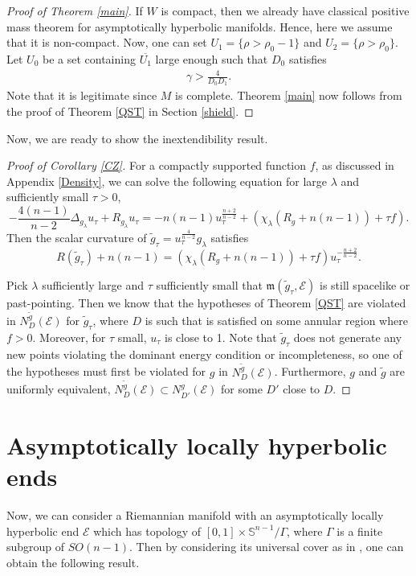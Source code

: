 \documentclass[11pt]{amsart}
\makeatletter
\renewcommand*{\eqref}[1]{%
  \hyperref[{#1}]{\textup{\tagform@{\ref*{#1}}}}%
}
\newcommand{\be}{\begin{equation}}
\newcommand{\ee}{\end{equation}}
\theoremstyle{remark}
\numberwithin{equation}{section}
\def\be{\begin{equation}}
\def\ee{\end{equation}}
\def\m{\mathfrak{m}}
\def\l{\lambda}
\def\mE{\mathcal{E}}
\def\mE{\mathcal{E}}
\def\l {\lambda}
\makeatother
\begin{document}
{{\begin{proof}[Proof of Theorem \ref{main}]
If $W$ is compact, then we already have classical positive mass theorem for asymptotically hyperbolic manifolds. Hence, here we assume that it is non-compact. Now, one can set $U_1=\{\rho > \rho_0-1\}$ and $U_2=\{\rho > \rho_0\}$. Let $U_0$ be a set containing $\overline{U_1}$ large enough such that $D_0$ satisfies 
\be 
\begin{split}
\gamma>\frac{4}{D_0D_1}. 
\end{split}
\ee 
Note that it is legitimate since $M$ is complete. Theorem \ref{main} now follows from the proof of Theorem \ref{QST} in Section \ref{shield}. 
\end{proof}

Now, we are ready to show the inextendibility result. 

\begin{proof}[Proof of Corollary \ref{CZ}]
For a compactly supported function $f$, as discussed in Appendix \ref{Density}, we can solve the following equation for large $\l$ and sufficiently small $\tau>0$, 
\[-\frac{4(n-1)}{n-2}\Delta_{g_{\lambda}} u_\tau + R_{g_\l} u_{\tau}=-n(n-1) u_{\tau}^{\frac{n+2}{n-2}}+(\chi_{\lambda}(R_g+n(n-1))+\tau f).\]
Then the scalar curvature of $\tilde g_{\tau}=u_{\tau}^{\frac{4}{n-2}}g_{\l}$ satisfies 
\[R(\tilde g_\tau)+n(n-1)=(\chi_{\lambda}(R_g+n(n-1))+\tau f)u^{-\frac{n+2}{n-2}}_\tau.\] 

Pick $\l$ sufficiently large and $\tau$ sufficiently small that $\m(\tilde g_{\tau},\mE)$ is still spacelike or past-pointing. Then we know that the hypotheses of Theorem \ref{QST} are violated in $N_D^{\tilde g}(\mathcal E)$ for $\tilde g_{\tau}$, where $D$ is such that \eqref{largeness} is satisfied on some annular region where $f>0$. Moreover, for $\tau$ small, $u_\tau$ is close to 1. Note that $\tilde g_{\tau}$ does not generate any new points violating the dominant energy condition or incompleteness, so one of the hypotheses must first be violated for $g$ in $N^{\tilde g}_D(\mathcal E)$. Furthermore,  $g$ and $\tilde g$ are uniformly equivalent, $N_D^{\tilde g}(\mathcal E)\subset N^g_{D'}(\mathcal E)$ for some $D'$ close to $D$. 
\end{proof}

\section{Asymptotically locally hyperbolic ends}\label{ALH}
Now, we can consider a Riemannian manifold with an asymptotically locally hyperbolic end $\mE$ which has topology of $[0,1]\times \mathbb{S}^{n-1}/\Gamma$, where $\Gamma$ is a finite subgroup of $SO(n-1)$. Then by considering its universal cover as in \cite{CG21}, one can obtain the following result. 

}}
\end{document}
